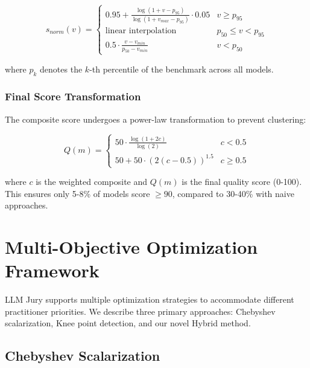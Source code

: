 \documentclass[11pt,a4paper]{article}
\begin{document}
\begin{equation}
s_{norm}(v) = \begin{cases}
0.95 + \frac{\log(1 + v - p_{95})}{\log(1 + v_{max} - p_{95})} \cdot 0.05 & v \geq p_{95} \\
\text{linear interpolation} & p_{50} \leq v < p_{95} \\
0.5 \cdot \frac{v - v_{min}}{p_{50} - v_{min}} & v < p_{50}
\end{cases}
\end{equation}

where $p_k$ denotes the $k$-th percentile of the benchmark across all models.

\subsubsection{Final Score Transformation}

The composite score undergoes a power-law transformation to prevent clustering:

\begin{equation}
Q(m) = \begin{cases}
50 \cdot \frac{\log(1 + 2c)}{\log(2)} & c < 0.5 \\
50 + 50 \cdot (2(c - 0.5))^{1.5} & c \geq 0.5
\end{cases}
\end{equation}

where $c$ is the weighted composite and $Q(m)$ is the final quality score (0-100). This ensures only 5-8\% of models score $\geq 90$, compared to 30-40\% with naive approaches.


\section{Multi-Objective Optimization Framework}
\label{sec:optimization}

LLM Jury supports multiple optimization strategies to accommodate different practitioner priorities. We describe three primary approaches: Chebyshev scalarization, Knee point detection, and our novel Hybrid method.

\subsection{Chebyshev Scalarization}
\end{document}
